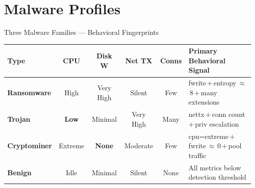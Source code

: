 \documentclass[aspectratio=169,12pt]{beamer}
\newcommand{\R}[1]{\textcolor{accent-r}{\textbf{#1}}}
\newcommand{\T}[1]{\textcolor{accent-t}{\textbf{#1}}}
\newcommand{\C}[1]{\textcolor{accent-c}{\textbf{#1}}}
\newcommand{\G}[1]{\textcolor{accent-g}{\textbf{#1}}}
\begin{document}
\section{Malware Profiles}

\begin{frame}{Three Malware Families — Behavioral Fingerprints}
  \footnotesize
  \setlength{\tabcolsep}{5pt}
  \renewcommand{\arraystretch}{1.3}
  \begin{tabular}{@{} l c c c c l @{}}
    \toprule
    \textbf{Type} & \textbf{CPU} & \textbf{Disk W} & \textbf{Net TX}
                  & \textbf{Conns} & \textbf{Primary Behavioral Signal} \\
    \midrule
    \R{Ransomware}  & High   & \alert{Very High} & Silent
                    & Few  & fwrite\,$+$\,entropy\,$\approx$\,8\,$+$\,many extensions \\
    \T{Trojan}      & \textbf{Low}    & Minimal  & \alert{Very High}
                    & \alert{Many} & nettx\,$+$\,conn count\,$+$\,priv escalation \\
    \C{Cryptominer} & \alert{Extreme} & \textbf{None}   & Moderate
                    & Few  & cpu=extreme\,$+$\,fwrite$\,\approx\,$0\,$+$\,pool traffic \\
    \G{Benign}      & Idle   & Minimal  & Silent
                    & None & All metrics below detection threshold \\
    \bottomrule
  \end{tabular}


\end{frame}
\end{document}
